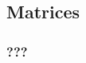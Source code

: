\documentclass[12pt,a4paper]{article}
\begin{document}

	\subsection{Matrices}

        \subsubsection{???}
\end{document}
